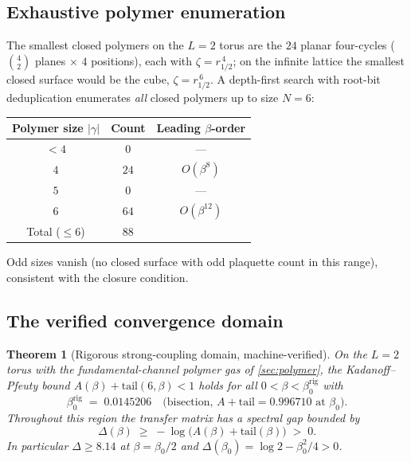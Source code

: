 \documentclass[11pt,a4paper]{article}
\newtheorem{theorem}{Theorem}[section]
\newcommand{\gap}{\Delta}
\newcommand{\betaZ}{\beta_0}
\begin{document}
\subsection{Exhaustive polymer enumeration}
\label{sec:enum}

The smallest closed polymers on the $L = 2$ torus are the $24$ planar
four-cycles ($\binom{4}{2}$ planes $\times$ $4$ positions), each with
$\zeta = r_{1/2}^{\,4}$; on the infinite lattice the smallest closed surface
would be the cube, $\zeta = r_{1/2}^{\,6}$.  A depth-first search with
root-bit deduplication enumerates \emph{all} closed polymers up to size
$N = 6$:
\begin{center}
\begin{tabular}{@{}ccc@{}}
\toprule
Polymer size $|\gamma|$ & Count & Leading $\beta$-order \\
\midrule
$< 4$ & $0$ & --- \\
$4$ & $24$ & $O(\beta^8)$ \\
$5$ & $0$ & --- \\
$6$ & $64$ & $O(\beta^{12})$ \\
\midrule
Total ($\le 6$) & $88$ & \\
\bottomrule
\end{tabular}
\end{center}
Odd sizes vanish (no closed surface with odd plaquette count in this
range), consistent with the closure condition.

\subsection{The verified convergence domain}
\label{sec:beta0}

\begin{theorem}[Rigorous strong-coupling domain, machine-verified]
\label{thm:kp}
On the $L = 2$ torus with the fundamental-channel polymer gas of
\cref{sec:polymer}, the Kadanoff--Pfeuty bound
$A(\beta) + \mathrm{tail}(6,\beta) < 1$ holds for all
$0 < \beta < \betaZ^{\mathrm{rig}}$ with
\begin{equation}
  \betaZ^{\mathrm{rig}} \;=\; 0.0145206 \quad\text{(bisection, } A +
  \mathrm{tail} = 0.996710 \text{ at } \betaZ\text{)}.
  \label{eq:beta0}
\end{equation}
Throughout this region the transfer matrix has a spectral gap bounded by
\begin{equation}
  \gap(\beta) \;\ge\; -\log\bigl(A(\beta) + \mathrm{tail}(\beta)\bigr)
  \;>\; 0 .
  \label{eq:gapkp}
\end{equation}
In particular $\gap \ge 8.14$ at $\beta = \betaZ/2$ and
$\gap(\betaZ) = \log 2 - \betaZ^2/4 > 0$.
\end{theorem}
\end{document}
